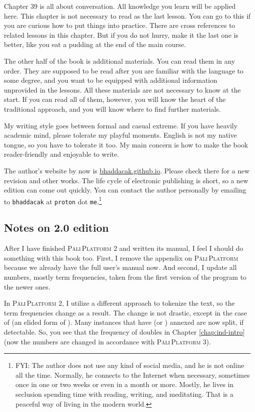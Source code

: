 Chapter 39 is all about conversation. All knowledge you learn will be applied here. This chapter is not necessary to read as the last lesson. You can go to this if you are curious how to put things into practice. There are cross references to related lessons in this chapter. But if you do not hurry, make it the last one is better, like you eat a pudding at the end of the main course.

The other half of the book is additional materials. You can read them in any order. They are supposed to be read after you are familiar with the language to some degree, and you want to be equipped with additional information unprovided in the lessons. All these materials are not necessary to know at the start. If you can read all of them, however, you will know the heart of the traditional approach, and you will know where to find further materials.

My writing style goes between formal and casual extreme. If you have heavily academic mind, please tolerate my playful moments. English is not my native tongue, so you have to tolerate it too. My main concern is how to make the book reader-friendly and enjoyable to write.

The author's website by now is \url{bhaddacak.github.io}. Please check there for a new revision and other works. The life cycle of electronic publishing is short, so a new edition can come out quickly. You can contact the author personally by emailing to \texttt{bhaddacak} at \texttt{proton} dot \texttt{me}.\footnote{FYI: The author does not use any kind of social media, and he is not online all the time. Normally, he connects to the Internet when necessary, sometimes once in one or two weeks or even in a month or more. Mostly, he lives in seclusion spending time with reading, writing, and meditating. That is a peaceful way of living in the modern world.}

\subsection*{Notes on 2.0 edition}

After I have finished \textsc{P\=ali\,Platform} 2 and written its manual, I feel I should do something with this book too. First, I remove the appendix on \textsc{P\=ali\,Platform} because we already have the full user's manual now. And second, I update all numbers, mostly term frequencies, taken from the first version of the program to the newer ones.

In \textsc{P\=ali\,Platform} 2, I utilize a different approach to tokenize the text, so the term frequencies change as a result. The change is not drastic, except in the case of  (an elided form of ). Many instances that have  (or ) annexed are now split, if detectable. So, you see that the frequency of  doubles in Chapter \ref{chap:ind-intro} (now the numbers are changed in accordance with \textsc{P\=ali\,Platform} 3).

